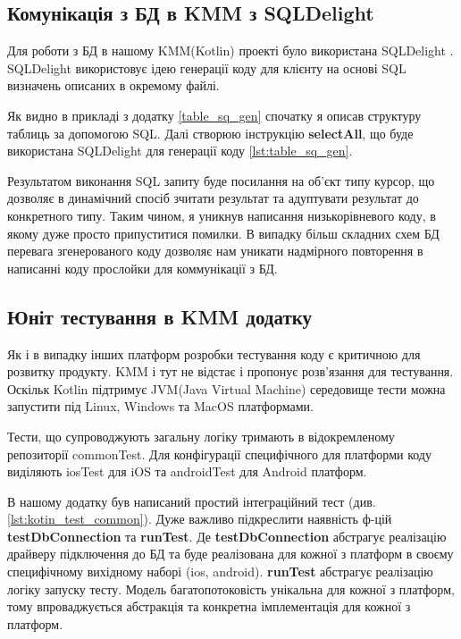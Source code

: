 \subsection{Комунікація з БД в KMM з SQLDelight}
\label{subsec:kmm_sqldelight}
Для роботи з БД в нашому KMM(Kotlin) проекті було використана SQLDelight \cite{sqldelight_home}.
SQLDelight використовує ідею генерації коду для клієнту на основі SQL визначень описаних в окремому файлі.

Як видно в прикладі з додатку \ref{table_sq_gen} спочатку я описав структуру таблиць за допомогою SQL.
Далі створюю інструкцію \textbf{selectAll}, що буде використана SQLDelight для генерації коду \ref{lst:table_sq_gen}.

Результатом виконання SQL запиту буде посилання на об'єкт типу курсор, що дозволяє в динамічний спосіб зчитати
результат та адуптувати результат до конкретного типу. Таким чином, я уникнув написання низькорівневого коду,
в якому дуже просто припуститися помилки. В випадку більш складних схем БД перевага згенерованого коду дозволяє
нам уникати надмірного повторення в написанні коду прослойки для коммунікації з БД.

\subsection{Юніт тестування в KMM додатку}
\label{subsec:kmm_unit_testing}

Як і в випадку інших платформ розробки тестування коду є критичною для розвитку продукту.
KMM і тут не відстає і пропонує розв'язання для тестування.
Оскільк Kotlin підтримує JVM(Java Virtual Machine) середовище тести можна запустити під Linux, Windows та MacOS платформами.

Тести, що супроводжують загальну логіку тримають в відокремленому репозиторії commonTest.
Для конфігурації специфічного для платформи коду виділяють iosTest для iOS та androidTest для Android платформ.

В нашому додатку був написаний простий інтеграційний тест (див. \ref{lst:kotin_test_common}).
Дуже важливо підкреслити наявність ф-цій \textbf{testDbConnection} та \textbf{runTest}.
Де \textbf{testDbConnection} абстрагує реалізацію драйверу підключення до БД та буде реалізована для кожної
з платформ в своєму специфічному вихідному наборі (ios, android).
\textbf{runTest} абстрагує реалізацію логіку запуску тесту.
Модель багатопотоковість унікальна для кожної з платформ, тому впроваджується абстракція та конкретна імплементація
для кожної з платформ.


